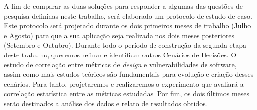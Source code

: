 %

A fim de comparar as duas soluções para responder a algumas das questões de pesquisa definidas neste trabalho, será elaborado um protocolo de estudo de caso. Este protocolo será projetado durante os dois primeiros meses de trabalho (Julho e Agosto) para que a sua aplicação seja realizada nos dois meses posteriores (Setembro e Outubro).
%
Durante todo o período de construção da segunda etapa deste trabalho, queremos refinar e identificar outros Cenários de Decisões. O estudo de correlação entre métricas de \emph{design} e vulnerabilidades de software, assim como mais estudos teóricos são fundamentais para evolução e criação desses cenários. Para tanto, projetaremos e realizaremos o experimento que avaliará a correlação estatística entre as métricas estudadas. Por fim, os dois últimos meses serão destinados a análise dos dados e relato de resultados obtidos. 
	
